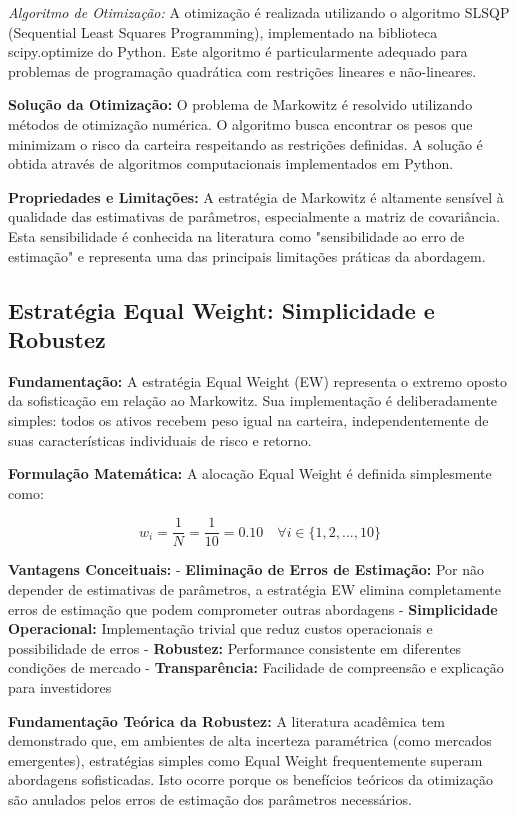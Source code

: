 \textit{Algoritmo de Otimização:} A otimização é realizada utilizando o algoritmo SLSQP (Sequential Least Squares Programming), implementado na biblioteca scipy.optimize do Python. Este algoritmo é particularmente adequado para problemas de programação quadrática com restrições lineares e não-lineares.

\textbf{Solução da Otimização:} O problema de Markowitz é resolvido utilizando métodos de otimização numérica. O algoritmo busca encontrar os pesos que minimizam o risco da carteira respeitando as restrições definidas. A solução é obtida através de algoritmos computacionais implementados em Python.

\textbf{Propriedades e Limitações:} A estratégia de Markowitz é altamente sensível à qualidade das estimativas de parâmetros, especialmente a matriz de covariância. Esta sensibilidade é conhecida na literatura como "sensibilidade ao erro de estimação" e representa uma das principais limitações práticas da abordagem.

\subsection{Estratégia Equal Weight: Simplicidade e Robustez}

\textbf{Fundamentação:} A estratégia Equal Weight (EW) representa o extremo oposto da sofisticação em relação ao Markowitz. Sua implementação é deliberadamente simples: todos os ativos recebem peso igual na carteira, independentemente de suas características individuais de risco e retorno.

\textbf{Formulação Matemática:} A alocação Equal Weight é definida simplesmente como:

\begin{equation}
w_i = \frac{1}{N} = \frac{1}{10} = 0.10 \quad \forall i \in \{1, 2, ..., 10\}
\end{equation}

\textbf{Vantagens Conceituais:}
- \textbf{Eliminação de Erros de Estimação:} Por não depender de estimativas de parâmetros, a estratégia EW elimina completamente erros de estimação que podem comprometer outras abordagens
- \textbf{Simplicidade Operacional:} Implementação trivial que reduz custos operacionais e possibilidade de erros
- \textbf{Robustez:} Performance consistente em diferentes condições de mercado
- \textbf{Transparência:} Facilidade de compreensão e explicação para investidores

\textbf{Fundamentação Teórica da Robustez:} A literatura acadêmica tem demonstrado que, em ambientes de alta incerteza paramétrica (como mercados emergentes), estratégias simples como Equal Weight frequentemente superam abordagens sofisticadas. Isto ocorre porque os benefícios teóricos da otimização são anulados pelos erros de estimação dos parâmetros necessários.

